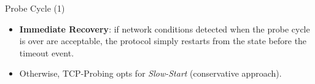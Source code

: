 \begin{frame}{Probe Cycle (1)}
   \begin{itemize}
        \item \textbf{Immediate Recovery}: \newline
	      if network conditions
	      detected when the probe cycle is over are
	      acceptable, the protocol simply restarts from
	      the state before the timeout event.
        \item Otherwise, TCP-Probing opts for \textit{Slow-Start} (conservative
	      approach).
   \end{itemize}
\end{frame}

